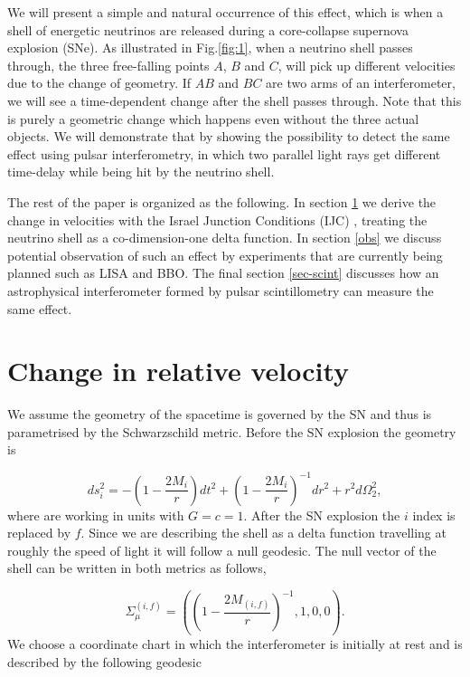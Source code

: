 \documentclass[aps,showpacs,twocolumn,floats,prd,superscriptaddress,nofootinbib]{revtex4-1}
\begin{document}
We will present a simple and natural occurrence of this effect, which is when a shell of energetic neutrinos are released during a core-collapse supernova explosion (SNe). As illustrated in Fig.\ref{fig:1}, when a neutrino shell passes through, the three free-falling points $A$, $B$ and $C$, will pick up different velocities due to the change of geometry. If $AB$ and $BC$ are two arms of an interferometer, we will see a time-dependent change after the shell passes through. Note that this is purely a geometric change which happens even without the three actual objects. We will demonstrate that by showing the possibility to detect the same effect using pulsar interferometry, in which two parallel light rays get different time-delay while being hit by the neutrino shell.

The rest of the paper is organized as the following. In section \ref{RelV} we derive the change in velocities with the Israel Junction Conditions (IJC) \cite{Isr66}, treating the neutrino shell as a co-dimension-one delta function. In section \ref{obs} we discuss potential observation of such an effect by experiments that are currently being planned such as LISA and BBO. The final section \ref{sec-scint} discusses how an astrophysical interferometer formed by pulsar scintillometry can measure the same effect.


\section{Change in relative velocity}
\label{RelV}

We assume the geometry of the spacetime is governed by the SN and thus is parametrised by the Schwarzschild metric. Before the SN explosion the geometry is

\begin{equation}
	ds^2_i = - \left( 1 - \frac{2M_i}{r} \right) dt^2 + \left( 1 - \frac{2M_i}{r} \right)^{-1} dr^2 + r^2 d \Omega_2^2,
\end{equation}
where are working in units with $G = c =1$. After the SN explosion the $i$ index is replaced by $f$. Since we are describing the shell as a delta function travelling at roughly the speed of light it will follow a null geodesic. The null vector of the shell can be written in both metrics as follows,

\begin{equation}
	\Sigma_\mu^{(i,f)} = \left( \left( 1 - \frac{2M_{(i,f)}}{r} \right)^{-1}, 1, 0, 0 \right).
\end{equation}
We choose a coordinate chart in which the interferometer is initially at rest and is described by the following geodesic
\end{document}
